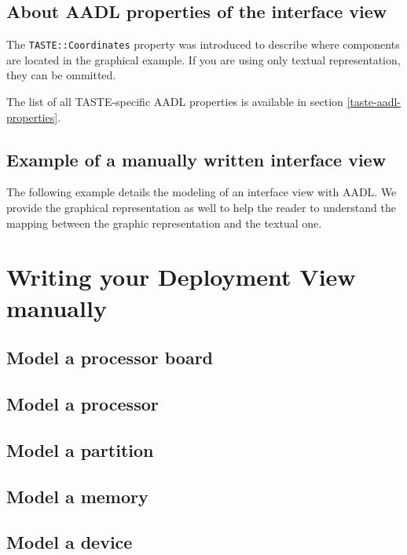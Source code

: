 \documentclass[11pt]{book}
\newcommand{\Concept}[1]{#1\xspace}
\newcommand{\aadl}{\Concept{AADL}}
\newcommand{\taste}{\Concept{TASTE}}
\begin{document}
      \subsection{About AADL properties of the interface view}
      The \texttt{TASTE::Coordinates} property was introduced to describe where
      components are located in the graphical example. If you are using only
      textual representation, they can be ommitted.

      The list of all \taste-specific \aadl properties is available in section 
      \ref{taste-aadl-properties}.

      \subsection{Example of a manually written interface view}
      The following example details the modeling of an interface view with AADL.
      We provide the graphical representation as well to help the reader to
      understand the mapping between the graphic representation and the textual
      one.

      \centerline{}

      

   \section{Writing your Deployment View manually}

      \subsection{Model a processor board}

      \subsection{Model a processor}

      \subsection{Model a partition}

      \subsection{Model a memory}

      \subsection{Model a device}
\end{document}
